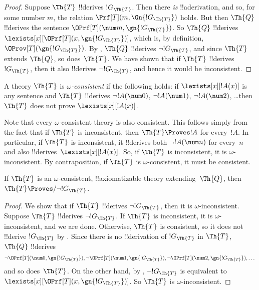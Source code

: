 \documentclass[../../../include/open-logic-section]{subfiles}
\begin{document}
\begin{proof}
Suppose $\Th{T}$ !!{derive}s $!G_\Th{T}$. Then there \emph{is}
!!a{derivation}, and so, for some number $m$, the relation $\Prf[T](m,
\Gn{!G_\Th{T}})$ holds. But then $\Th{Q}$ !!{derive}s the sentence
$\OPrf[T](\num m, \gn{!G_\Th{T}})$. So $\Th{Q}$ !!{derive}s
$\lexists[x][\OPrf[T](x,\gn{!G_\Th{T}})]$, which is, by definition,
$\OProv[T](\gn{!G_\Th{T}})$. By , $\Th{Q}$ !!{derive}s
$\lnot !G_\Th{T}$, and since $\Th{T}$ extends $\Th{Q}$, so
does~$\Th{T}$. We have shown that if $\Th{T}$ !!{derive}s $!G_\Th{T}$, then
it also !!{derive}s $\lnot !G_\Th{T}$, and hence it would be inconsistent.
\end{proof}

\begin{defn}
A theory $\Th{T}$ is \emph{$\omega$-consistent} if the following holds: if
$\lexists[x][!A(x)]$ is any sentence and $\Th{T}$ !!{derive}s $\lnot
!A(\num 0)$, $\lnot !A(\num 1)$, $\lnot !A(\num 2)$, \dots then $\Th{T}$
does not prove $\lexists[x][!A(x)]$.
\end{defn}

Note that every $\omega$-consistent theory is also consistent. This
follows simply from the fact that if $\Th{T}$ is inconsistent, then
$\Th{T} \Proves !A$ for every~$!A$. In particular, if $\Th{T}$ is
inconsistent, it !!{derive}s both $\lnot !A(\num n)$ for every~$n$ and
also !!{derive}s~$\lexists[x][!A(x)]$. So, if $\Th{T}$ is
inconsistent, it is $\omega$-inconsistent. By contraposition, if
$\Th{T}$ is $\omega$-consistent, it must be consistent.

\begin{lem}
If $\Th{T}$ is an $\omega$-consistent, !!{axiomatizable} theory
extending~$\Th{Q}$, then $\Th{T} \Proves/ \lnot !G_\Th{T}$.
\end{lem}

\begin{proof}
We show that if $\Th{T}$ !!{derive}s $\lnot !G_\Th{T}$, then it is
$\omega$-inconsistent. Suppose $\Th{T}$ !!{derive}s $\lnot !G_\Th{T}$. If
$\Th{T}$ is inconsistent, it is $\omega$-inconsistent, and we are
done. Otherwise, $\Th{T}$ is consistent, so it does not !!{derive}
$!G_\Th{T}$ by . Since there is no
!!{derivation} of $!G_\Th{T}$ in $\Th{T}$, $\Th{Q}$ !!{derive}s
\[
\lnot \OPrf[T](\num 0, \gn{!G_\Th{T}}), \lnot \OPrf[T](\num 1,
\gn{!G_\Th{T}}), \lnot \OPrf[T](\num 2, \gn{!G_\Th{T}}), \dots
\]
and so does~$\Th{T}$.  On the other hand, by , $\lnot
!G_\Th{T}$ is equivalent to
$\lexists[x][\OPrf[T](x,\gn{!G_\Th{T}})]$. So $\Th{T}$ is
$\omega$-inconsistent.
\end{proof}
\end{document}
